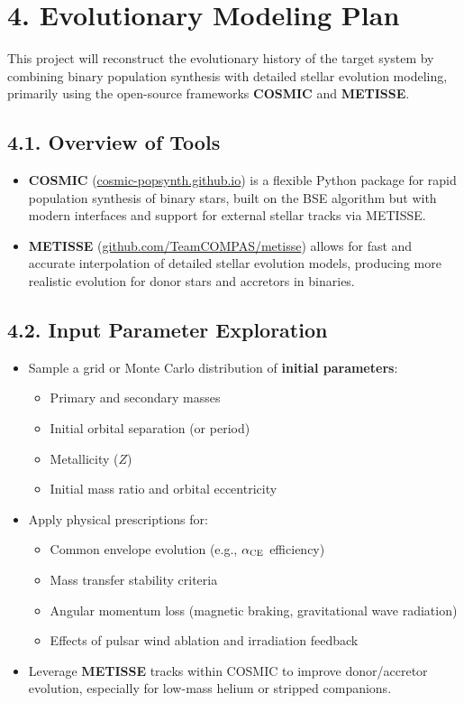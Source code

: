 \documentclass[12pt]{article}
\begin{document}
\section*{4. Evolutionary Modeling Plan}

This project will reconstruct the evolutionary history of the target system by combining binary population synthesis with detailed stellar evolution modeling, primarily using the open-source frameworks \textbf{COSMIC} and \textbf{METISSE}.

\subsection*{4.1. Overview of Tools}
\begin{itemize}
    \item \textbf{COSMIC} (\href{https://cosmic-popsynth.github.io/}{cosmic-popsynth.github.io}) is a flexible Python package for rapid population synthesis of binary stars, built on the BSE algorithm but with modern interfaces and support for external stellar tracks via METISSE.
    \item \textbf{METISSE} (\href{https://github.com/TeamCOMPAS/metisse}{github.com/TeamCOMPAS/metisse}) allows for fast and accurate interpolation of detailed stellar evolution models, producing more realistic evolution for donor stars and accretors in binaries.
\end{itemize}

\subsection*{4.2. Input Parameter Exploration}
\begin{itemize}
    \item Sample a grid or Monte Carlo distribution of \textbf{initial parameters}:
        \begin{itemize}
            \item Primary and secondary masses
            \item Initial orbital separation (or period)
            \item Metallicity ($Z$)
            \item Initial mass ratio and orbital eccentricity
        \end{itemize}
    \item Apply physical prescriptions for:
        \begin{itemize}
            \item Common envelope evolution (e.g., $\alpha_{\rm CE}$ efficiency)
            \item Mass transfer stability criteria
            \item Angular momentum loss (magnetic braking, gravitational wave radiation)
            \item Effects of pulsar wind ablation and irradiation feedback
        \end{itemize}
    \item Leverage \textbf{METISSE} tracks within COSMIC to improve donor/accretor evolution, especially for low-mass helium or stripped companions.
\end{itemize}
\end{document}
